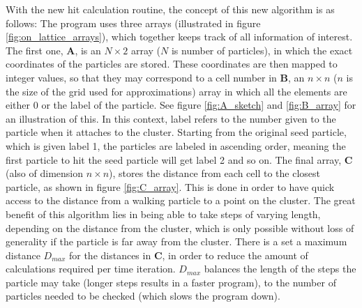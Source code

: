 With the new hit calculation routine, the concept of this new algorithm is as follows: The program uses three arrays (illustrated in figure \ref{fig:on_lattice_arrays}), which together keeps track of all information of interest. The first one, $\textbf{A}$, is an $N \times 2$ array ($N$ is number of particles), in which the exact coordinates of the particles are stored. These coordinates are then mapped to integer values, so that they may correspond to a cell number in $\textbf{B}$, an $n \times n$ ($n$ is the size of the grid used for approximations) array in which all the elements are either $0$ or the label of the particle. See figure \ref{fig:A_sketch} and \ref{fig:B_array} for an illustration of this. In this context, label refers to the number given to the particle when it attaches to the cluster. Starting from the original seed particle, which is given label 1, the particles are labeled in ascending order, meaning the first particle to hit the seed particle will get label 2 and so on. The final array, $\textbf{C}$ (also of dimension $n \times n$), stores the distance from each cell to the closest particle, as shown in figure \ref{fig:C_array}. This is done in order to have quick access to the distance from a walking particle to a point on the cluster. The great benefit of this algorithm lies in being able to take steps of varying length, depending on the distance from the cluster, which is only possible without loss of generality if the particle is far away from the cluster. There is a set a maximum distance $D_{max}$ for the distances in $\textbf{C}$, in order to reduce the amount of calculations required per time iteration. $D_{max}$ balances the length of the steps the particle may take (longer steps results in a faster program), to the number of particles needed to be checked (which slows the program down).


